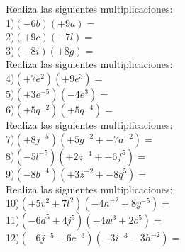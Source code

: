\documentclass[a4paper,12pt]{article}
\begin{document}
 \pagebreak 
Realiza las siguientes multiplicaciones: \vspace{1cm}\\ 
1)$(-6b)(+9a)=$\vspace{1cm}\\ 
2)$(+9c)(-7l)=$\vspace{1cm}\\ 
3)$(-8i)(+8g)=$\vspace{1cm}\\ 
Realiza las siguientes multiplicaciones: \vspace{1cm}\\ 
4)$(+7e^{2})(+9e^{3} )=$\vspace{1cm}\\ 
5)$(+3e^{-5})(-4e^{3} )=$\vspace{1cm}\\ 
6)$(+5q^{-2})(+5q^{-4} )=$\vspace{1cm}\\ 
Realiza las siguientes multiplicaciones: \vspace{1cm}\\ 
7)$(+8j^{-5})(+5g^{-2}+-7a^{-2} )=$\vspace{1cm}\\ 
8)$(-5l^{-5})(+2z^{-4}+-6f^{5} )=$\vspace{1cm}\\ 
9)$(-8b^{-4})(+3z^{-2}+-8q^{5} )=$\vspace{1cm}\\ 
Realiza las siguientes multiplicaciones: \vspace{1cm}\\ 
10)$(+5v^{2}+7l^{2} )(-4h^{-2}+8y^{-5} )=$\vspace{1cm}\\ 
11)$(-6d^{5}+4j^{5} )(-4w^{3}+2o^{5} )=$\vspace{1cm}\\ 
12)$(-6j^{-5}-6c^{-3} )(-3i^{-3}-3h^{-2} )=$\vspace{1cm}\\ 
\end{document}
